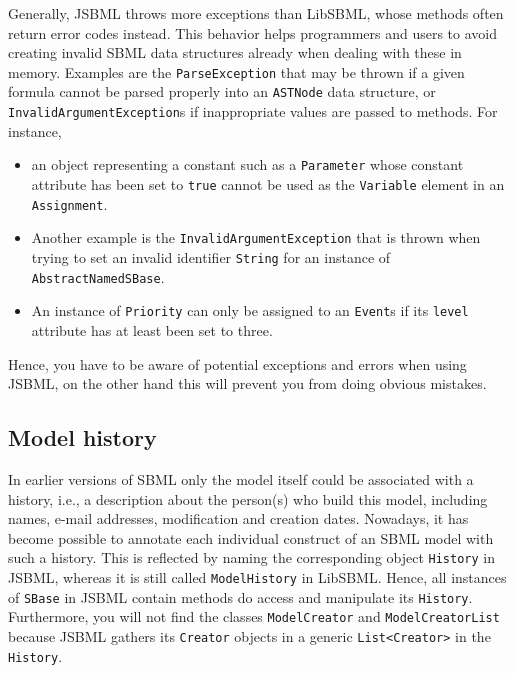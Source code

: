 \documentclass[
  BCOR12mm,
  letterpaper,
  11pt,
  headsepline,
  pointlessnumbers,
  tablecaptionabove,
  onelinecaption,
  headinclude,
  appendixprefix,
  idxtotoc,
  bibtotoc,
  twoside,
  titlepage
]{scrartcl}
\begin{document}
Generally, JSBML throws more exceptions than LibSBML, whose methods often return error codes instead. This behavior helps
programmers and users to avoid creating invalid SBML data structures already
when dealing with these in memory. Examples are the \texttt{ParseException}
 that
may be thrown if a given formula cannot be parsed properly into an
\texttt{ASTNode} data structure, or \texttt{InvalidArgumentException}s
 if inappropriate values are passed to methods. For instance,
\begin{itemize}
 \item an object representing
a constant such as a \texttt{Parameter}
whose constant attribute has been set to
\texttt{true} cannot be used as the \texttt{Variable} element in an
\texttt{Assignment}.
 \item Another example is the \texttt{InvalidArgumentException} that
is thrown when trying to set an invalid identifier \texttt{String} for an instance of \texttt{AbstractNamedSBase}.
 \item An instance of \texttt{Priority} can only be assigned to an \texttt{Event}s if its \texttt{level} attribute has at least been set to three.
\end{itemize}
Hence, you have to be aware of potential
exceptions and errors when using JSBML, on the other hand this will
prevent you from doing obvious mistakes.


\subsection{Model history}

In earlier versions of SBML only the model itself could be associated
with a history, i.e., a description about the person(s) who build this model,
including names, e-mail addresses, modification and creation dates. Nowadays, it
has become possible to annotate each individual construct of an SBML model with
such a history. This is reflected by naming the corresponding object
\texttt{History}
in JSBML, whereas it is still called
\texttt{ModelHistory} in LibSBML. Hence, all
instances of \texttt{SBase} in JSBML contain methods do access and manipulate its
\texttt{History}. Furthermore, you will not find the classes
\texttt{ModelCreator}
and \texttt{ModelCreatorList} because JSBML
gathers its \texttt{Creator} objects
in a generic \texttt{List<Creator>} in the \texttt{History}.
 
\end{document}
